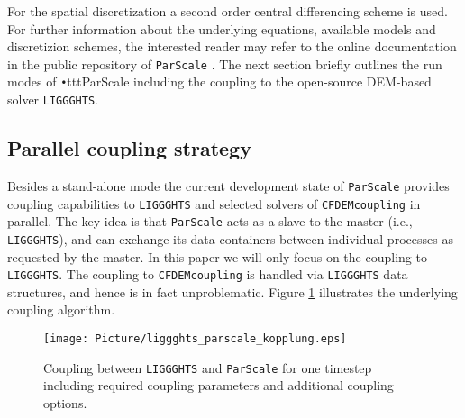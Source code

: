 \documentclass{particles2015}
\begin{document}
For the spatial discretization a second order central differencing scheme is used. For further information about the underlying equations, available models and discretizion schemes, the interested reader may refer to the online documentation in the public repository of \texttt{ParScale} \cite{ParScale_Public}. The next section briefly outlines the run modes of \texttt{•}ttt{ParScale} including the coupling to the open-source DEM-based solver \texttt{LIGGGHTS}\textsuperscript{\textregistered}.

\subsection{Parallel coupling strategy}
Besides a stand-alone mode the current development state of \texttt{ParScale} provides coupling capabilities to \texttt{LIGGGHTS}\textsuperscript{\textregistered} and selected solvers of \texttt{CFDEMcoupling} in parallel. The key idea is that \texttt{ParScale} acts as a slave to the master (i.e., \texttt{LIGGGHTS}\textsuperscript{\textregistered}), and can exchange its data containers between individual processes as requested by the master. In this paper we will only focus on the coupling to \texttt{LIGGGHTS}\textsuperscript{\textregistered}. The coupling to \texttt{CFDEMcoupling} is handled via  \texttt{LIGGGHTS}\textsuperscript{\textregistered} data structures, and hence is in fact unproblematic. Figure \ref{fig:Coupling_parScale_LIGGGHTS} illustrates the underlying coupling algorithm.

\begin{figure}[h!]
   \centering
   \texttt{[image: Picture/liggghts\_parscale\_kopplung.eps]}
   \caption{Coupling between \texttt{LIGGGHTS}\textsuperscript{\textregistered} and \texttt{ParScale} for one timestep including required coupling parameters and additional coupling options.}
   \label{fig:Coupling_parScale_LIGGGHTS}
\end{figure}
\end{document}
